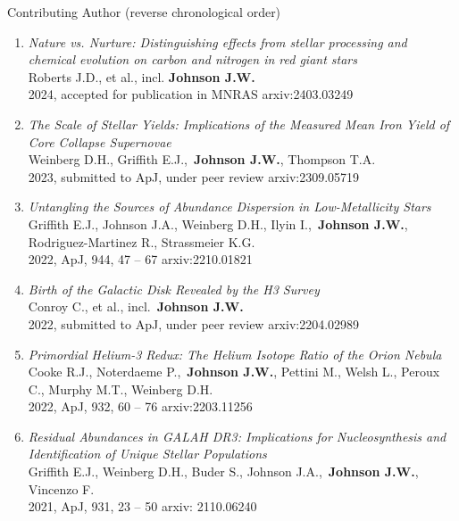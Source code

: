 \documentclass[cv.tex]{subfiles}
\begin{document}
\vspace{5mm}
\par\noindent
{\color{themecolor} \large Contributing Author}
(reverse chronological order)
\par\noindent
\begin{enumerate}

	\vspace{-3mm}

	\item \textit{Nature vs. Nurture: Distinguishing effects from stellar
	processing and chemical evolution on carbon and nitrogen in red giant stars}
	\\
	Roberts J.D., et al., incl. \textbf{Johnson J.W.}
	\\
	2024, accepted for publication in MNRAS \hfill arxiv:2403.03249

	\item \textit{The Scale of Stellar Yields: Implications of the Measured
	Mean Iron Yield of Core Collapse Supernovae}
	\\
	Weinberg D.H., Griffith E.J.,~\textbf{Johnson J.W.}, Thompson T.A.
	\\
	2023, submitted to ApJ, under peer review \hfill arxiv:2309.05719

	\item \textit{Untangling the Sources of Abundance Dispersion in
	Low-Metallicity Stars}
	\\
	Griffith E.J., Johnson J.A., Weinberg D.H., Ilyin I.,~\textbf{Johnson J.W.},
	Rodriguez-Martinez R., Strassmeier K.G.
	\\
	2022, ApJ, 944, 47 -- 67 \hfill arxiv:2210.01821

	\item \textit{Birth of the Galactic Disk Revealed by the H3 Survey}
	\\
	Conroy C., et al., incl.~\textbf{Johnson J.W.}
	\\
	2022, submitted to ApJ, under peer review \hfill arxiv:2204.02989

	\item \textit{Primordial Helium-3 Redux: The Helium Isotope Ratio of the
	Orion Nebula}
	\\
	Cooke R.J., Noterdaeme P.,~\textbf{Johnson J.W.}, Pettini M., Welsh L.,
	Peroux C., Murphy M.T., Weinberg D.H.
	\\
	2022, ApJ, 932, 60 -- 76 \hfill arxiv:2203.11256

	\item \textit{Residual Abundances in GALAH DR3: Implications for
	Nucleosynthesis and Identification of Unique Stellar Populations}
	\\
	Griffith E.J., Weinberg D.H., Buder S., Johnson J.A.,~\textbf{Johnson J.W.},
	Vincenzo F.
	\\
	2021, ApJ, 931, 23 -- 50 \hfill arxiv: 2110.06240


\end{enumerate}
\end{document}
